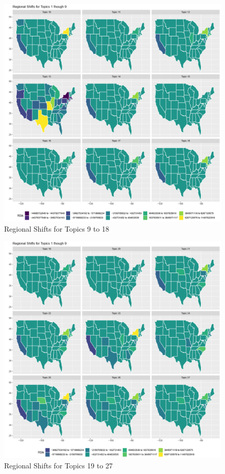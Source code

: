 \begin{figure}
	\centering
	\includegraphics[width=1\linewidth]{Figures/ChapterV/States_10_18}
	\caption[Regional Shifts for Topics 9 to 18]{Regional Shifts for Topics 9 to 18}
	\label{fig:states10-18}
\end{figure}

\begin{figure}
	\centering
	\includegraphics[width=1\linewidth]{Figures/ChapterV/States_19_27}
	\caption[Regional Shifts for Topics 19 to 27]{Regional Shifts for Topics 19 to 27}
	\label{fig:states19-27}
\end{figure}

